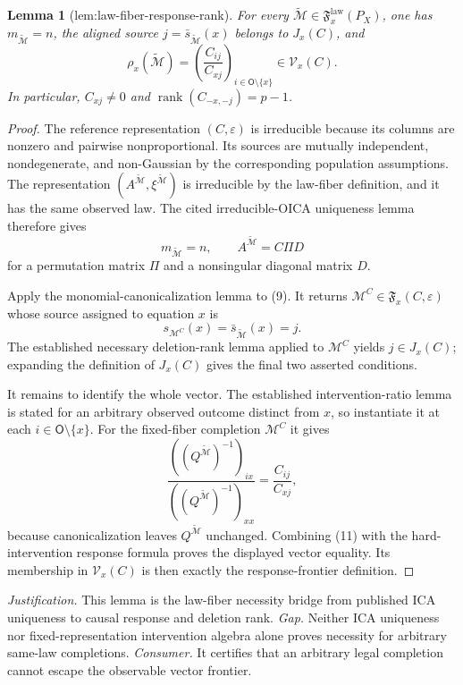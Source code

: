 \documentclass{article}
\newtheorem{lemma}{Lemma}
\begin{document}
\begin{lemma}[lem:law-fiber-response-rank]\label{lem:law-fiber-response-rank}
For every \(\widetilde{\mathcal M}\in\mathfrak F_x^{\mathrm{law}}(P_X)\), one has \(m_{\widetilde{\mathcal M}}=n\), the aligned source \(j=\bar s_{\widetilde{\mathcal M}}(x)\) belongs to \(J_x(C)\), and
\[
 \rho_x(\widetilde{\mathcal M})
 =\left(\frac{C_{ij}}{C_{xj}}\right)_{i\in\mathsf O\setminus\{x\}}
 \in\mathcal V_x(C).
\]
In particular, \(C_{xj}\ne0\) and \(\operatorname{rank}(C_{-x,-j})=p-1\).
\end{lemma}
\begin{proof}
The reference representation \((C,\varepsilon)\) is irreducible because its columns are nonzero and pairwise nonproportional. Its sources are mutually independent, nondegenerate, and non-Gaussian by the corresponding population assumptions. The representation \((A^{\widetilde{\mathcal M}},\xi^{\widetilde{\mathcal M}})\) is irreducible by the law-fiber definition, and it has the same observed law. The cited irreducible-OICA uniqueness lemma therefore gives
\[
 m_{\widetilde{\mathcal M}}=n,
 \qquad
 A^{\widetilde{\mathcal M}}=C\Pi D \tag{9}
\]
for a permutation matrix \(\Pi\) and a nonsingular diagonal matrix \(D\).

Apply the monomial-canonicalization lemma to (9). It returns \(\mathcal M^C\in\mathfrak F_x(C,\varepsilon)\) whose source assigned to equation \(x\) is
\[
 s_{\mathcal M^C}(x)=\bar s_{\widetilde{\mathcal M}}(x)=j. \tag{10}
\]
The established necessary deletion-rank lemma applied to \(\mathcal M^C\) yields \(j\in J_x(C)\); expanding the definition of \(J_x(C)\) gives the final two asserted conditions.

It remains to identify the whole vector. The established intervention-ratio lemma is stated for an arbitrary observed outcome distinct from \(x\), so instantiate it at each \(i\in\mathsf O\setminus\{x\}\). For the fixed-fiber completion \(\mathcal M^C\) it gives
\[
 \frac{((Q^{\widetilde{\mathcal M}})^{-1})_{ix}}
 {((Q^{\widetilde{\mathcal M}})^{-1})_{xx}}
 =\frac{C_{ij}}{C_{xj}}, \tag{11}
\]
because canonicalization leaves \(Q^{\widetilde{\mathcal M}}\) unchanged. Combining (11) with the hard-intervention response formula proves the displayed vector equality. Its membership in \(\mathcal V_x(C)\) is then exactly the response-frontier definition.
\end{proof}
\par\smallskip\noindent \textit{Justification.} This lemma is the law-fiber necessity bridge from published ICA uniqueness to causal response and deletion rank. \textit{Gap.} Neither ICA uniqueness nor fixed-representation intervention algebra alone proves necessity for arbitrary same-law completions. \textit{Consumer.} It certifies that an arbitrary legal completion cannot escape the observable vector frontier.
\end{document}
